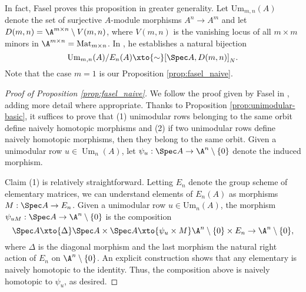 \begin{remark}
    In fact, Fasel proves this proposition in greater generality. Let $\mathrm{Um}_{m,n}(A)$ denote the set of surjective $A$-module morphisms $A^n \to A^m$ and let $D(m,n) = \A^{m \times n}\setminus V(m,n)$, where $V(m,n)$ is the vanishing locus of all $m \times m$ minors in $\A^{m \times n} = \operatorname{Mat}_{m \times n}$. In \cite[Theorem 2.1]{Fasel_2010}, he establishes a natural bijection
    \[
    \operatorname{Um}_{m,n}(A)/E_n(A) \xto{\sim} [\Spec A, D(m,n)]_{N}.
    \]
    Note that the case $m = 1$ is our Proposition \ref{prop:fasel_naive}. 
\end{remark}

\begin{proof}[Proof of Proposition \ref{prop:fasel_naive}]
    We follow the proof given by Fasel in \cite[Theorem 2.1]{Fasel_2010}, adding more detail where appropriate. Thanks to Proposition \ref{prop:unimodular-basic}, it suffices to prove that (1) unimodular rows belonging to the same orbit define naively homotopic morphisms and (2) if two unimodular rows define naively homotopic morphisms, then they belong to the same orbit. Given a unimodular row $u \in \operatorname{Um}_n(A)$, let $\psi_u: \Spec A \to \A^n\setminus\{0\}$ denote the induced morphism. 

    Claim (1) is relatively straightforward. Letting $E_n$ denote the group scheme of elementary matrices, we can understand elements of $E_n(A)$ as morphisms $M: \Spec A \to E_n$. Given a unimodular row $u \in \mathrm{Um}_n(A)$, the morphism $\psi_{uM}: \Spec A \to \A^n\setminus\{0\}$ is the composition
    \[
    \Spec A \xto{\Delta} \Spec A \times \Spec A \xto{\psi_u \times M} \A^n\setminus\{0\} \times E_n \to \A^n \setminus \{0\}, 
    \]
    where $\Delta$ is the diagonal morphism and the last morphism the natural right action of $E_n$ on $\A^n \setminus\{0\}$. An explicit construction shows that any elementary is naively homotopic to the identity. Thus, the composition above is naively homotopic to $\psi_u$, as desired.
    

\end{proof}
